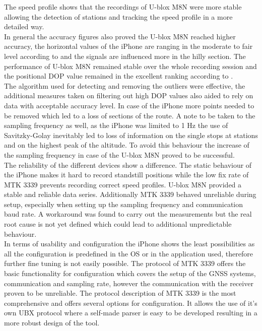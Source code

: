 \documentclass{article}
\begin{document}
		The speed profile shows that the recordings of U-blox M8N were more stable allowing the detection of stations and tracking the speed profile in a more detailed way. \\
		In general the accuracy figures also proved the U-blox M8N reached higher accuracy, the horizontal values of the iPhone are ranging in the moderate to fair level according to \cite{tahsinAnalysisDOPIts2015} and the signals are influenced more in the hilly section. The performance of U-blox M8N remained stable over the whole recording session and the positional DOP value remained in the excellent ranking according to \cite{tahsinAnalysisDOPIts2015}. \\
		The algorithm used for detecting and removing the outliers were effective, the additional measures taken on filtering out high DOP values also aided to rely on data with acceptable accuracy level. In case of the iPhone more points needed to be removed which led to a loss of sections of the route. A note to be taken to the sampling frequency as well, as the iPhone was limited to 1 Hz the use of Savitzky-Golay inevitably led to loss of information on the single stops at stations and on the highest peak of the altitude. To avoid this behaviour the increase of the sampling frequency in case of the U-blox M8N proved to be successful. \\
		The reliability of the different devices show a difference. The static behaviour of the iPhone makes it hard to record standstill positions while the low fix rate of MTK 3339 prevents recording correct speed profiles. U-blox M8N provided a stable and reliable data series. Additionally MTK 3339 behaved unreliable during setup, especially when setting up the sampling frequency and communication baud rate. A workaround was found to carry out the measurements but the real root cause is not yet defined which could lead to additional unpredictable behaviour. \\
		In terms of usability and configuration the iPhone shows the least possibilities as all the configuration is predefined in the OS or in the application used, therefore further fine tuning is not easily possible. The protocol of MTK 3339 offers the basic functionality for configuration which covers the setup of the GNSS systems, communication and sampling rate, however the communication with the receiver proven to be unreliable. The protocol description of MTK 3339 is the most comprehensive and offers several options for configuration. It allows the use of it's own UBX protocol where a self-made parser is easy to be developed resulting in a more robust design of the tool.
\end{document}
